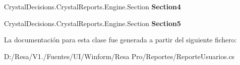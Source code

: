 \begin{DoxyCompactItemize}
\item 
Crystal\+Decisions.\+Crystal\+Reports.\+Engine.\+Section {\bfseries Section4}\hspace{0.3cm}{\ttfamily  [get]}\label{class_resa___pro_1_1_reportes_1_1_reporte_usuarios_a5382a12978665c18205227297175dbe6}

\item 
Crystal\+Decisions.\+Crystal\+Reports.\+Engine.\+Section {\bfseries Section5}\hspace{0.3cm}{\ttfamily  [get]}\label{class_resa___pro_1_1_reportes_1_1_reporte_usuarios_a895e0696fb26b202e44aaa6dd7d88457}

\end{DoxyCompactItemize}


La documentación para esta clase fue generada a partir del siguiente fichero\+:\begin{DoxyCompactItemize}
\item 
D\+:/\+Resa/\+V1./\+Fuentes/\+U\+I/\+Winform/\+Resa Pro/\+Reportes/Reporte\+Usuarios.\+cs\end{DoxyCompactItemize}
